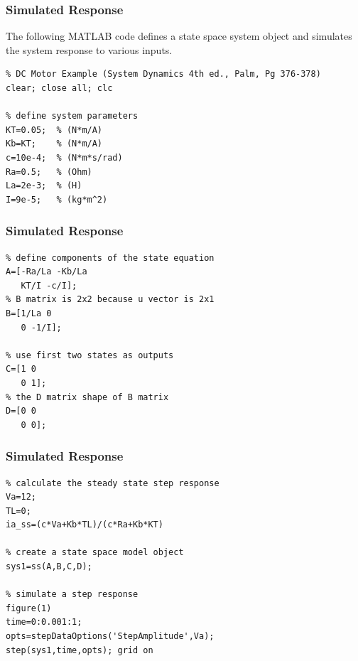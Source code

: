 \documentclass[fleqn]{beamer}                  %
\newcommand{\sectiontitleV}{Simulated Response}
\begin{document}
	\begin{frame}[containsverbatim,label=sectionV] \small
		\frametitle{\sectiontitleV}

		The following MATLAB code defines a state space system object and simulates the system response to various inputs.
		
		\begin{lstlisting}
% DC Motor Example (System Dynamics 4th ed., Palm, Pg 376-378)  
clear; close all; clc

% define system parameters
KT=0.05;  % (N*m/A)
Kb=KT;    % (N*m/A)
c=10e-4;  % (N*m*s/rad)   
Ra=0.5;   % (Ohm)
La=2e-3;  % (H)
I=9e-5;   % (kg*m^2)
		\end{lstlisting}
\end{frame}	

	\begin{frame}[containsverbatim,label=sectionV] \small
		\frametitle{\sectiontitleV}
		\begin{lstlisting}
% define components of the state equation
A=[-Ra/La -Kb/La
   KT/I -c/I];
% B matrix is 2x2 because u vector is 2x1
B=[1/La 0 
   0 -1/I];

% use first two states as outputs
C=[1 0
   0 1];
% the D matrix shape of B matrix 
D=[0 0
   0 0];
		\end{lstlisting}
	\end{frame}

	\begin{frame}[containsverbatim,label=sectionV] \small
		\frametitle{\sectiontitleV}
		\begin{lstlisting}
% calculate the steady state step response
Va=12;
TL=0;
ia_ss=(c*Va+Kb*TL)/(c*Ra+Kb*KT)

% create a state space model object
sys1=ss(A,B,C,D);

% simulate a step response 
figure(1)
time=0:0.001:1;
opts=stepDataOptions('StepAmplitude',Va);
step(sys1,time,opts); grid on
		\end{lstlisting}


	\end{frame}	
\end{document}
